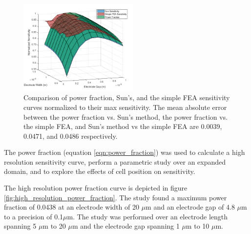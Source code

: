 \begin{figure}[h]
    \centering
    \includegraphics[width=0.53\textwidth]{images/normalizedSensitivityComp.png}
    \caption[Comparison of power fraction, Sun's, and the simple FEA sensitivity curves.]{Comparison of power fraction, Sun's, and the simple FEA sensitivity curves normalized to their max sensitivity. The mean absolute error between the power fraction vs. Sun's method, the power fraction vs. the simple FEA, and Sun's method vs the simple FEA are 0.0039, 0.0471, and 0.0486 respectively.}
    \label{fig:sun-simple-powerFrac-comp}
\end{figure}

\newpage

\par The power fraction (equation \ref{eqn:power_fraction}) was used to calculate a high resolution sensitivity curve, perform a parametric study over an expanded domain, and to explore the effects of cell position on sensitivity. 

\par The high resolution power fraction curve is depicted in figure \ref{fig:high_resolution_power_fraction}. The study found a maximum power fraction of 0.0438 at an electrode width of 20 $\mu$m and an electrode gap of 4.8 $\mu$m to a precision of 0.1$\mu$m. The study was performed over an electrode length spanning 5 $\mu$m to 20 $\mu$m and the electrode gap spanning 1 $\mu$m to 10 $\mu$m. 

